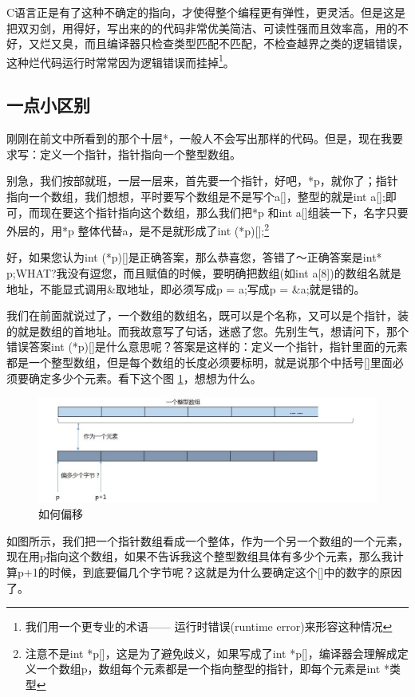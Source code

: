 \documentclass[11pt,twoside,a4paper,titlepage]{article}	%
\newcommand{\kw}[1]{\textcolor[rgb]{0.0,0.0,0.63}{ #1}}
\begin{document}
C语言正是有了这种不确定的指向，才使得整个编程更有弹性，更灵活。但是这是把双刃剑，用得好，写出来的的代码非常优美简洁、可读性强而且效率高，用的不好，又烂又臭，而且编译器只检查类型匹配不匹配，不检查越界之类的逻辑错误，这种烂代码运行时常常因为逻辑错误而挂掉\footnote{我们用一个更专业的术语——\kw{运行时错误(runtime error)}来形容这种情况}。

\subsection{一点小区别}\label{sec:diff}
刚刚在前文中所看到的那个十层*，一般人不会写出那样的代码。但是，现在我要求写：定义一个指针，指针指向一个整型数组。

别急，我们按部就班，一层一层来，首先要一个指针，好吧，*p，就你了；指针指向一个数组，我们想想，平时要写个数组是不是写个a[]，整型的就是int a[];即可，而现在要这个指针指向这个数组，那么我们把*p 和int a[]组装一下，名字只要外层的，用*p 整体代替a，是不是就形成了int (*p)[];\footnote{注意不是int *p[]，这是为了避免歧义，如果写成了int *p[]，编译器会理解成定义一个数组p，数组每个元素都是一个指向整型的指针，即每个元素是int *类型}

好，如果您认为int (*p)[]是正确答案，那么恭喜您，答错了～正确答案是int* p;WHAT?我没有逗您，而且赋值的时候，要明确把数组(如int a[8])的数组名就是地址，不能显式调用\&取地址，即必须写成p = a;写成p = \&a;就是错的。

我们在前面就说过了，一个数组的数组名，既可以是个名称，又可以是个指针，装的就是数组的首地址。而我故意写了句话，迷惑了您。先别生气，想请问下，那个错误答案int (*p)[]是什么意思呢？答案是这样的：定义一个指针，指针里面的元素都是一个整型数组，但是每个数组的长度必须要标明，就是说那个中括号[]里面必须要确定多少个元素。看下这个图 \ref{fig:diff_01}，想想为什么。

\begin{figure}[bpht]
\centering
\includegraphics[scale=.5]{../src/diff_01.jpg}
\caption{如何偏移}
\label{fig:diff_01}
\end{figure}

如图所示，我们把一个指针数组看成一个整体，作为一个另一个数组的一个元素，现在用p指向这个数组，如果不告诉我这个整型数组具体有多少个元素，那么我计算p+1的时候，到底要偏几个字节呢？这就是为什么要确定这个[]中的数字的原因了。
\end{document}
